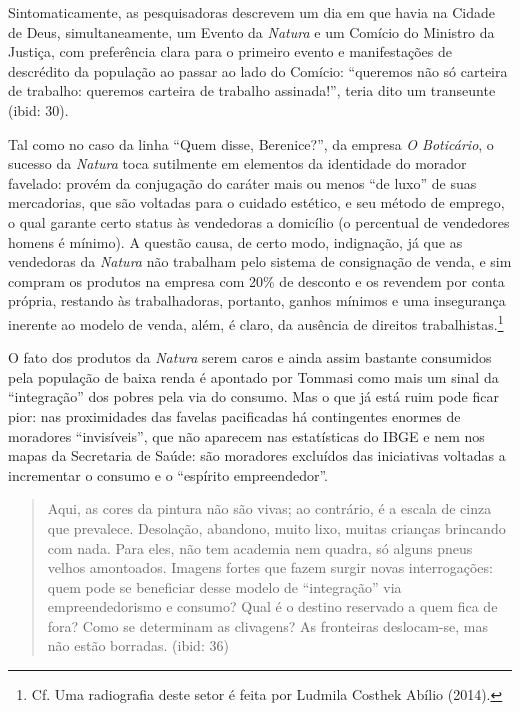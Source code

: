 Sintomaticamente, as pesquisadoras descrevem um dia em que havia na
Cidade de Deus, simultaneamente, um Evento da \emph{Natura} e um Comício
do Ministro da Justiça, com preferência clara para o primeiro evento e
manifestações de descrédito da população ao passar ao lado do Comício:
``queremos não só carteira de trabalho: queremos carteira de trabalho
assinada!'', teria dito um transeunte (ibid: 30).

Tal como no caso da linha ``Quem disse, Berenice?'', da empresa \emph{O
Boticário}, o sucesso da \emph{Natura} toca sutilmente em elementos da
identidade do morador favelado: provém da conjugação do caráter mais ou
menos ``de luxo'' de suas mercadorias, que são voltadas para o cuidado
estético, e seu método de emprego, o qual garante certo status às
vendedoras a domicílio (o percentual de vendedores homens é mínimo). A
questão causa, de certo modo, indignação, já que as vendedoras da
\emph{Natura} não trabalham pelo sistema de consignação de venda, e sim
compram os produtos na empresa com 20\% de desconto e os revendem por
conta própria, restando às trabalhadoras, portanto, ganhos mínimos e uma
insegurança inerente ao modelo de venda, além, é claro, da ausência de
direitos trabalhistas.\footnote{Cf. Uma radiografia deste setor é feita
  por Ludmila Costhek Abílio (2014).}

O fato dos produtos da \emph{Natura} serem caros e ainda assim bastante
consumidos pela população de baixa renda é apontado por Tommasi como
mais um sinal da ``integração'' dos pobres pela via do consumo. Mas o
que já está ruim pode ficar pior: nas proximidades das favelas
pacificadas há contingentes enormes de moradores ``invisíveis'', que não
aparecem nas estatísticas do IBGE e nem nos mapas da Secretaria de
Saúde: são moradores excluídos das iniciativas voltadas a incrementar o
consumo e o ``espírito empreendedor''.

\begin{quote}
Aqui, as cores da pintura não são vivas; ao contrário, é a escala de
cinza que prevalece. Desolação, abandono, muito lixo, muitas crianças
brincando com nada. Para eles, não tem academia nem quadra, só alguns
pneus velhos amontoados. Imagens fortes que fazem surgir novas
interrogações: quem pode se beneficiar desse modelo de ``integração''
via empreendedorismo e consumo? Qual é o destino reservado a quem fica
de fora? Como se determinam as clivagens? As fronteiras deslocam-se, mas
não estão borradas. (ibid: 36)
\end{quote}

